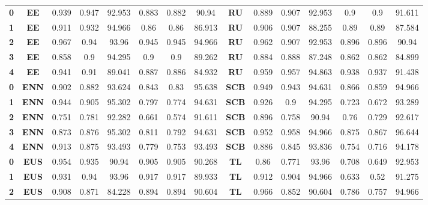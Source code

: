 {{\begin{tabular}{c|c|cccccc|ccccccc}
\textbf{0} & \textbf{EE} & 0.939 & 0.947 & 92.953 & 0.883 & 0.882 & 90.94 & \multicolumn{1}{c|}{\textbf{RU}} & 0.889 & 0.907 & 92.953 & 0.9   & 0.9   & 91.611 \\
\textbf{1} & \textbf{EE} & 0.911 & 0.932 & 94.966 & 0.86  & 0.86  & 86.913 & \multicolumn{1}{c|}{\textbf{RU}} & 0.906 & 0.907 & 88.255 & 0.89  & 0.89  & 87.584 \\
\textbf{2} & \textbf{EE} & 0.967 & 0.94  & 93.96 & 0.945 & 0.945 & 94.966 & \multicolumn{1}{c|}{\textbf{RU}} & 0.962 & 0.907 & 92.953 & 0.896 & 0.896 & 90.94 \\
\textbf{3} & \textbf{EE} & 0.858 & 0.9   & 94.295 & 0.9   & 0.9   & 89.262 & \multicolumn{1}{c|}{\textbf{RU}} & 0.884 & 0.888 & 87.248 & 0.862 & 0.862 & 84.899 \\
\textbf{4} & \textbf{EE} & 0.941 & 0.91  & 89.041 & 0.887 & 0.886 & 84.932 & \multicolumn{1}{c|}{\textbf{RU}} & 0.959 & 0.957 & 94.863 & 0.938 & 0.937 & 91.438 \\
\textbf{0} & \textbf{ENN} & 0.902 & 0.882 & 93.624 & 0.843 & 0.83  & 95.638 & \multicolumn{1}{c|}{\textbf{SCB}} & 0.949 & 0.943 & 94.631 & 0.866 & 0.859 & 94.966 \\
\textbf{1} & \textbf{ENN} & 0.944 & 0.905 & 95.302 & 0.797 & 0.774 & 94.631 & \multicolumn{1}{c|}{\textbf{SCB}} & 0.926 & 0.9   & 94.295 & 0.723 & 0.672 & 93.289 \\
\textbf{2} & \textbf{ENN} & 0.751 & 0.781 & 92.282 & 0.661 & 0.574 & 91.611 & \multicolumn{1}{c|}{\textbf{SCB}} & 0.896 & 0.758 & 90.94 & 0.76  & 0.729 & 92.617 \\
\textbf{3} & \textbf{ENN} & 0.873 & 0.876 & 95.302 & 0.811 & 0.792 & 94.631 & \multicolumn{1}{c|}{\textbf{SCB}} & 0.952 & 0.958 & 94.966 & 0.875 & 0.867 & 96.644 \\
\textbf{4} & \textbf{ENN} & 0.913 & 0.875 & 93.493 & 0.779 & 0.753 & 93.493 & \multicolumn{1}{c|}{\textbf{SCB}} & 0.886 & 0.845 & 93.836 & 0.754 & 0.716 & 94.178 \\
\textbf{0} & \textbf{EUS} & 0.954 & 0.935 & 90.94 & 0.905 & 0.905 & 90.268 & \multicolumn{1}{c|}{\textbf{TL}} & 0.86  & 0.771 & 93.96 & 0.708 & 0.649 & 92.953 \\
\textbf{1} & \textbf{EUS} & 0.931 & 0.94  & 93.96 & 0.917 & 0.917 & 89.933 & \multicolumn{1}{c|}{\textbf{TL}} & 0.912 & 0.904 & 94.966 & 0.633 & 0.52  & 91.275 \\
\textbf{2} & \textbf{EUS} & 0.908 & 0.871 & 84.228 & 0.894 & 0.894 & 90.604 & \multicolumn{1}{c|}{\textbf{TL}} & 0.966 & 0.852 & 90.604 & 0.786 & 0.757 & 94.966 \\

\end{tabular}}}
